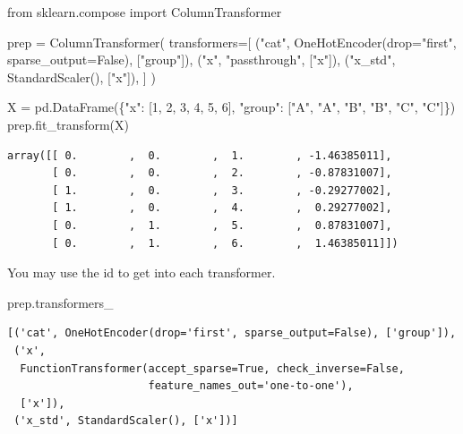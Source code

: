 \documentclass[
  letterpaper,
  DIV=11,
  numbers=noendperiod]{scrreprt}
\newenvironment{Shaded}{\begin{snugshade}}{\end{snugshade}}
\newcommand{\DecValTok}[1]{\textcolor[rgb]{0.68,0.00,0.00}{#1}}
\newcommand{\ImportTok}[1]{\textcolor[rgb]{0.00,0.46,0.62}{#1}}
\newcommand{\NormalTok}[1]{\textcolor[rgb]{0.00,0.23,0.31}{#1}}
\newcommand{\OperatorTok}[1]{\textcolor[rgb]{0.37,0.37,0.37}{#1}}
\newcommand{\StringTok}[1]{\textcolor[rgb]{0.13,0.47,0.30}{#1}}
\newcommand{\VariableTok}[1]{\textcolor[rgb]{0.07,0.07,0.07}{#1}}
\theoremstyle{definition}
\theoremstyle{definition}
\theoremstyle{plain}
\theoremstyle{plain}
\theoremstyle{remark}
\begin{document}
\begin{Shaded}
\begin{Highlighting}[]
\ImportTok{from}\NormalTok{ sklearn.compose }\ImportTok{import}\NormalTok{ ColumnTransformer}

\NormalTok{prep }\OperatorTok{=}\NormalTok{ ColumnTransformer(}
\NormalTok{    transformers}\OperatorTok{=}\NormalTok{[}
\NormalTok{        (}\StringTok{"cat"}\NormalTok{, OneHotEncoder(drop}\OperatorTok{=}\StringTok{"first"}\NormalTok{, sparse\_output}\OperatorTok{=}\VariableTok{False}\NormalTok{), [}\StringTok{"group"}\NormalTok{]),}
\NormalTok{        (}\StringTok{"x"}\NormalTok{, }\StringTok{"passthrough"}\NormalTok{, [}\StringTok{"x"}\NormalTok{]),}
\NormalTok{        (}\StringTok{"x\_std"}\NormalTok{, StandardScaler(), [}\StringTok{"x"}\NormalTok{]),}
\NormalTok{    ]}
\NormalTok{)}

\NormalTok{X }\OperatorTok{=}\NormalTok{ pd.DataFrame(\{}\StringTok{"x"}\NormalTok{: [}\DecValTok{1}\NormalTok{, }\DecValTok{2}\NormalTok{, }\DecValTok{3}\NormalTok{, }\DecValTok{4}\NormalTok{, }\DecValTok{5}\NormalTok{, }\DecValTok{6}\NormalTok{], }\StringTok{"group"}\NormalTok{: [}\StringTok{"A"}\NormalTok{, }\StringTok{"A"}\NormalTok{, }\StringTok{"B"}\NormalTok{, }\StringTok{"B"}\NormalTok{, }\StringTok{"C"}\NormalTok{, }\StringTok{"C"}\NormalTok{]\})}
\NormalTok{prep.fit\_transform(X)}
\end{Highlighting}
\end{Shaded}

\begin{verbatim}
array([[ 0.        ,  0.        ,  1.        , -1.46385011],
       [ 0.        ,  0.        ,  2.        , -0.87831007],
       [ 1.        ,  0.        ,  3.        , -0.29277002],
       [ 1.        ,  0.        ,  4.        ,  0.29277002],
       [ 0.        ,  1.        ,  5.        ,  0.87831007],
       [ 0.        ,  1.        ,  6.        ,  1.46385011]])
\end{verbatim}

You may use the id to get into each transformer.

\begin{Shaded}
\begin{Highlighting}[]
\NormalTok{prep.transformers\_}
\end{Highlighting}
\end{Shaded}

\begin{verbatim}
[('cat', OneHotEncoder(drop='first', sparse_output=False), ['group']),
 ('x',
  FunctionTransformer(accept_sparse=True, check_inverse=False,
                      feature_names_out='one-to-one'),
  ['x']),
 ('x_std', StandardScaler(), ['x'])]
\end{verbatim}
\end{document}

